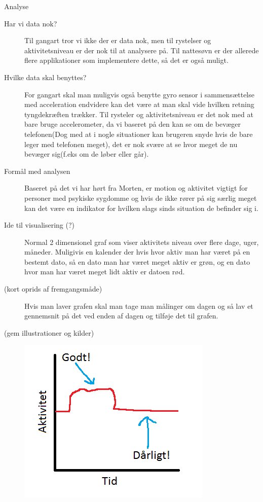 Analyse
\begin{description}
\item[Har vi data nok?] Til gangart tror vi ikke der er data nok, men til rystelser og aktivitetsniveau er der nok til at analysere på. Til nattesøvn er der allerede flere applikationer som implementere dette, så det er også muligt.
\item[Hvilke data skal benyttes?] For gangart skal man muligvis også benytte gyro sensor i sammensættelse med acceleration endvidere kan det være at man skal vide hvilken retning tyngdekræften trækker. Til rysteler og aktivitetsniveau er det nok med at bare bruge accelerometer, da vi baseret på den kan se om de bevæger telefonen(Dog med at i nogle situationer kan brugeren snyde hvis de bare leger med telefonen meget), det er nok svære at se hvor meget de nu bevæger sig(f.eks om de løber eller går). 
\item[Formål med analysen] Baseret på det vi har hørt fra Morten, er motion og aktivitet vigtigt for personer med psykiske sygdomme og hvis de ikke rører på sig særlig meget kan det være en indikator for hvilken slags sinds situation de befinder sig i.
\item[Ide til visualisering (?)] Normal 2 dimensionel graf som viser aktivitets niveau over flere dage, uger, måneder. Muligivis en kalender der hvis hvor aktiv man har været på en bestemt dato, så en dato man har været meget aktiv er grøn, og en dato hvor man har været meget lidt aktiv er datoen rød.
\item[(kort oprids af fremgangsmåde)] Hvis man laver grafen skal man tage man målinger om dagen og så lav et gennemsnit på det ved enden af dagen og tilføje det til grafen.
\item[(gem illustrationer og kilder)] \includegraphics{aktivitet_billed}
\end{description}